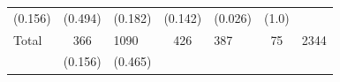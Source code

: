 \documentclass[11pt,a4paper,openany]{book}
\begin{document}
\begin{longtable}[]{@{}lclclcl@{}}
\begin{minipage}[t]{0.29\columnwidth}
(0.156)\strut
\end{minipage} & \begin{minipage}[t]{0.04\columnwidth}\raggedright\strut
(0.494)\strut
\end{minipage} & \begin{minipage}[t]{0.06\columnwidth}\centering\strut
(0.182)\strut
\end{minipage} & \begin{minipage}[t]{0.04\columnwidth}\raggedright\strut
(0.142)\strut
\end{minipage} & \begin{minipage}[t]{0.04\columnwidth}\centering\strut
(0.026)\strut
\end{minipage} & \begin{minipage}[t]{0.03\columnwidth}\raggedright\strut
(1.0)\strut
\end{minipage}\tabularnewline
\begin{minipage}[t]{0.29\columnwidth}\raggedright\strut
Total\strut
\end{minipage} & \begin{minipage}[t]{0.29\columnwidth}\centering\strut
366\strut
\end{minipage} & \begin{minipage}[t]{0.04\columnwidth}\raggedright\strut
1090\strut
\end{minipage} & \begin{minipage}[t]{0.06\columnwidth}\centering\strut
426\strut
\end{minipage} & \begin{minipage}[t]{0.04\columnwidth}\raggedright\strut
387\strut
\end{minipage} & \begin{minipage}[t]{0.04\columnwidth}\centering\strut
75\strut
\end{minipage} & \begin{minipage}[t]{0.03\columnwidth}\raggedright\strut
2344\strut
\end{minipage}\tabularnewline
\begin{minipage}[t]{0.29\columnwidth}\raggedright\strut
\strut
\end{minipage} & \begin{minipage}[t]{0.29\columnwidth}\centering\strut
(0.156)\strut
\end{minipage} & \begin{minipage}[t]{0.04\columnwidth}\raggedright\strut
(0.465)\strut
\end{minipage} & \begin{minipage}[t]{0.06\columnwidth}\centering\strut

\end{minipage}
\end{longtable}
\end{document}

